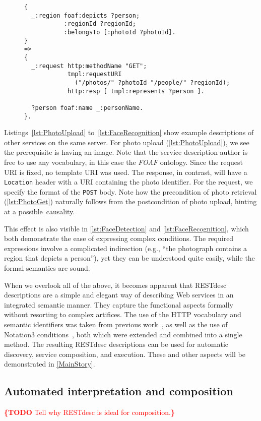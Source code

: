 \documentclass[runningheads,a4paper, twocolumn]{llncs}
\newcommand{\todo}[1]{\noindent\textcolor{red}{{\bf \{TODO} #1{\bf \}}}}
\begin{document}
\begin{figure}[float=t!]
\begin{lstlisting}[caption=RESTdesc description of face recognition,
                   label=lst:FaceRecognition, escapechar=§, belowskip=-1em]
{
  _:region foaf:depicts ?person;
           :regionId ?regionId;
           :belongsTo [:photoId ?photoId].
}
=>
{
  _:request http:methodName "GET";
            tmpl:requestURI
              ("/photos/" ?photoId "/people/" ?regionId);
            http:resp [ tmpl:represents ?person ].
  
  ?person foaf:name _:personName.
}.
\end{lstlisting}
\end{figure}

Listings~\ref{lst:PhotoUpload} to~\ref{lst:FaceRecognition} show example descriptions of other services on the same server. For photo upload (\autoref{lst:PhotoUpload}), we see the prerequisite is having an image. Note that the service description author is free to use any vocabulary, in this case the \emph{FOAF} ontology. Since the request URI is fixed, no template URI was used. The response, in contrast, will have a \Verb!Location! header with a URI containing the photo identifier. For the request, we specify the format of the \Verb!POST! body. Note how the precondition of photo retrieval (\autoref{lst:PhotoGet}) naturally follows from the postcondition of photo upload, hinting at a possible~causality.

This effect is also visible in \autoref{lst:FaceDetection} and \autoref{lst:FaceRecognition}, which both demonstrate the ease of expressing complex conditions. The required expressions involve a complicated indirection (e.g., ``the photograph contains a region that depicts a person''), yet they can be understood quite easily, while the formal semantics are sound.

When we overlook all of the above, it becomes apparent that RESTdesc descriptions are a simple and elegant way of describing Web services in an integrated semantic manner. They capture the functional aspects formally without resorting to complex artifices. The use of the HTTP vocabulary and semantic identifiers was taken from previous work~\cite{Steiner:2011p5006}, as well as the use of \mbox{Notation3} conditions~\cite{Verborgh:2010p2746}, both which were extended and combined into a single method. The resulting \mbox{RESTdesc} descriptions can be used for automatic discovery, service composition, and execution. These and other aspects will be demonstrated in \autoref{MainStory}.


\subsection{Automated interpretation and composition}
\label{Composition}
\todo{Tell why RESTdesc is ideal for composition.}
\end{document}
